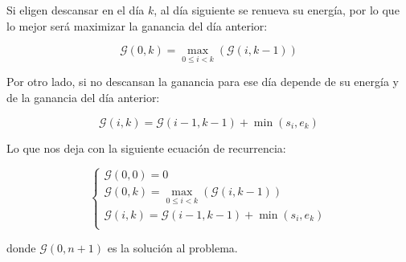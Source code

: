 Si eligen descansar en el d\'ia $k$, al d\'ia siguiente se renueva su
energ\'ia, por lo que lo mejor ser\'a maximizar la ganancia del d\'ia anterior:

\begin{equation*}
    \mathcal{G} \left( 0, k \right) = \max_{0 \le i < k} \left( \mathcal{G} \left( i, k - 1 \right) \right)
\end{equation*}

Por otro lado, si no descansan la ganancia para ese d\'ia depende de su
energ\'ia y de la ganancia del d\'ia anterior:

\begin{equation*}
    \mathcal{G} \left( i, k \right) = \mathcal{G} \left( i - 1, k - 1 \right) + \min \left( s_i, e_k \right)
\end{equation*}

Lo que nos deja con la siguiente ecuaci\'on de recurrencia:

\begin{equation}
    \begin{cases}
        \mathcal{G} \left( 0, 0 \right) = 0\\
        \mathcal{G} \left( 0, k \right) = \max_{0 \le i < k} \left( \mathcal{G} \left( i, k - 1 \right) \right)\\
        \mathcal{G} \left( i, k \right) = \mathcal{G} \left( i - 1, k - 1 \right) + \min \left( s_i, e_k \right)\\
    \end{cases}
\end{equation}

donde $\mathcal{G} \left( 0, n + 1 \right)$ es la soluci\'on al problema.
